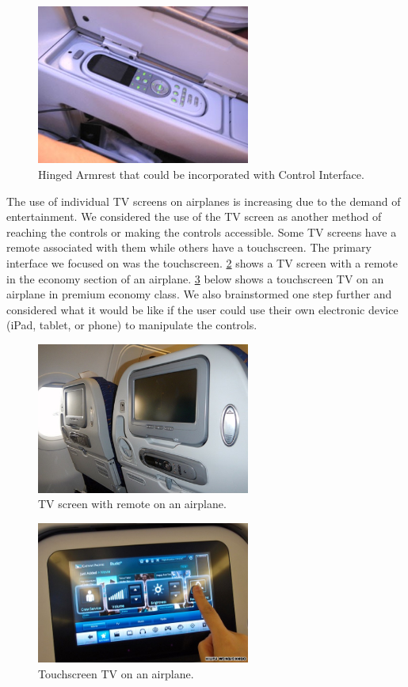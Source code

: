 \begin{figure}[h]
  \centering
     \includegraphics[width=7cm]{images/HingedArmrest.jpg}
   \caption{Hinged Armrest that could be incorporated with Control Interface. \cite{hinged}}
  \label{fig:HingedArmrest.jpg}
\end{figure}


The use of individual TV screens on airplanes is increasing due to the demand of entertainment.  We considered the use of the TV screen as another method of reaching the controls or making the controls accessible. Some TV screens have a remote associated with them while others have a touchscreen.  The primary interface we focused on was the touchscreen.  \ref{fig:TVScreenwithRemote.jpg} shows a TV screen with a remote in the economy section of an airplane.  \ref{fig:TouchscreenTV.jpg} below shows a touchscreen TV on an airplane in premium economy class. We also brainstormed one step further and considered what it would be like if the user could use their own electronic device (iPad, tablet, or phone) to manipulate the controls.

\begin{figure}[h]
  \centering
     \includegraphics[width=7cm]{images/TVScreenwithRemote.jpg}
   \caption{TV screen with remote on an airplane. \cite{TVremote}}
  \label{fig:TVScreenwithRemote.jpg}
\end{figure}

\begin{figure}[h]
  \centering
     \includegraphics[width=7cm]{images/TouchscreenTV.jpg}
   \caption{Touchscreen TV on an airplane. \cite{touchscreen} }
  \label{fig:TouchscreenTV.jpg}
\end{figure}

